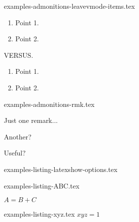 \begin{filecontents*}[overwrite]{examples-admonitions-leavevmode-items.tex}
\begin{tdoctip}
    \begin{enumerate}
        \item Point 1.
        \item Point 2.
    \end{enumerate}
\end{tdoctip}
VERSUS.
\begin{tdoctip}
    \begin{enumerate}[wide]
        \item Point 1.
        \item Point 2.
    \end{enumerate}
\end{tdoctip}
\end{filecontents*}


\begin{filecontents*}[overwrite]{examples-admonitions-rmk.tex}
\begin{tdocrem}
    Just one remark...
\end{tdocrem}

\begin{tdocrem}
    Another?
\end{tdocrem}

\begin{tdocrem}
    Useful?
\end{tdocrem}
\end{filecontents*}


\begin{filecontents*}[overwrite]{examples-listing-latexshow-options.tex}
\end{filecontents*}


\begin{filecontents*}[overwrite]{examples-listing-ABC.tex}
\begin{tdoclatex}[sbs]
    $A = B + C$
\end{tdoclatex}
\end{filecontents*}


\begin{filecontents*}[overwrite]{examples-listing-xyz.tex}
$x y z = 1$
\end{filecontents*}


